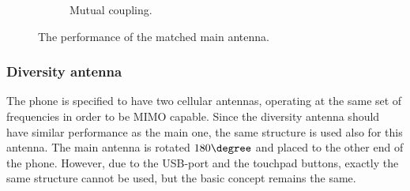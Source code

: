 \begin{figure}[H]
\begin{subfigure}[b]{0.49\textwidth}
        \caption{Mutual coupling.}
        \label{fig:main_final_res_match_coup}
    \end{subfigure}
    \caption{The performance of the matched main antenna.}
    \vspace{-15pt}
\end{figure}


\subsubsection{Diversity antenna}
\label{sec:diversity}
The phone is specified to have two cellular antennas, operating at the same set of frequencies in order to be MIMO capable. Since the diversity antenna should have similar performance as the main one, the same structure is used also for this antenna. The main antenna is rotated $180\degree$ and placed to the other end of the phone. However, due to the USB-port and the touchpad buttons, exactly the same structure cannot be used, but the basic concept remains the same.

